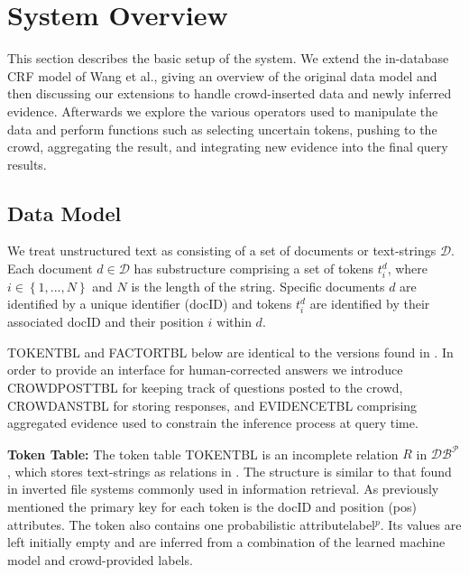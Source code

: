 \section{System Overview}

This section describes the basic setup of the system.  We extend the in-database CRF model of Wang et al.\cite{DBLP:journals/pvldb/WangFGH10}, giving an overview of the original data model and then discussing our extensions to handle crowd-inserted data and newly inferred evidence.  Afterwards we explore the various operators used to manipulate the data and perform functions such as selecting uncertain tokens, pushing to the crowd, aggregating the result, and integrating new evidence into the final query results. 

\subsection{Data Model}

We treat unstructured text as consisting of a set of documents or text-strings $\mathcal{D}$.  Each document $d\in\mathcal{D}$ has substructure comprising a set of tokens $t^{d}_{i}$, where $i\in\left\{1,...,N\right\}$ and $N$ is the length of the string.  Specific documents $d$ are identified  by a unique identifier (docID) and tokens $t^{d}_{i}$ are identified by their associated docID and their position $i$ within $d$.

T{\small OKEN}T{\small BL} and F{\small ACTOR}T{\small BL} below are identical to the versions found in \cite{DBLP:journals/pvldb/WangFGH10}.  In order to provide an interface for human-corrected answers we introduce C{\small ROWD}P{\small OST}T{\small BL} for keeping track of questions posted to the crowd, C{\small ROWD}A{\small NS}T{\small BL} for storing responses, and E{\small VIDENCE}T{\small BL} comprising aggregated evidence used to constrain the inference process at query time.

\noindent\textbf{Token Table:} The token table T{\small OKEN}T{\small BL} is an incomplete relation $R$ in $\mathcal{DB^{P}}$, which stores text-strings as relations in \sysName .  The structure is similar to that found in inverted file systems commonly used in information retrieval.  As previously mentioned the primary key for each token is the docID and position (pos) attributes.  The token also contains one probabilistic attribute\textemdash label$^{p}$.  Its values are left initially empty and are inferred from a combination of the learned machine model and crowd-provided labels.

